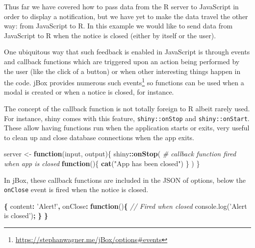 \documentclass[10pt,]{krantz}
\makeatletter
\newenvironment{Shaded}{\begin{snugshade}}{\end{snugshade}}
\newcommand{\AttributeTok}[1]{\textcolor[rgb]{0.61,0.61,0.61}{#1}}
\newcommand{\CommentTok}[1]{\textcolor[rgb]{0.37,0.37,0.37}{\textit{#1}}}
\newcommand{\ControlFlowTok}[1]{\textcolor[rgb]{0.27,0.27,0.27}{\textbf{#1}}}
\newcommand{\DataTypeTok}[1]{\textcolor[rgb]{0.27,0.27,0.27}{#1}}
\newcommand{\KeywordTok}[1]{\textcolor[rgb]{0.27,0.27,0.27}{\textbf{#1}}}
\newcommand{\NormalTok}[1]{#1}
\newcommand{\OperatorTok}[1]{\textcolor[rgb]{0.43,0.43,0.43}{\textbf{#1}}}
\newcommand{\StringTok}[1]{\textcolor[rgb]{0.5,0.5,0.5}{#1}}
\newcommand{\VariableTok}[1]{\textcolor[rgb]{0,0,0}{#1}}
\renewcommand{\href}[2]{#2\footnote{\url{#1}}}
\newenvironment{kframe}{%
\medskip{}
\setlength{\fboxsep}{.8em}
 \def\at@end@of@kframe{}%
 \ifinner\ifhmode%
  \def\at@end@of@kframe{\end{minipage}}%
  \begin{minipage}{\columnwidth}%
 \fi\fi%
 \def\FrameCommand##1{\hskip\@totalleftmargin \hskip-\fboxsep
 \colorbox{shadecolor}{##1}\hskip-\fboxsep
     \hskip-\linewidth \hskip-\@totalleftmargin \hskip\columnwidth}%
 \MakeFramed {\advance\hsize-\width
   \@totalleftmargin\z@ \linewidth\hsize
   \@setminipage}}%
 {\par\unskip\endMakeFramed%
 \at@end@of@kframe}
\renewenvironment{Shaded}{\begin{kframe}}{\end{kframe}}
\makeatother
\begin{document}
Thus far we have covered how to pass data from the R server to JavaScript in order to display a notification, but we have yet to make the data travel the other way: from JavaScript to R. In this example we would like to send data from JavaScript to R when the notice is closed (either by itself or the user).

One ubiquitous way that such feedback is enabled in JavaScript is through events and callback functions which are triggered upon an action being performed by the user (like the click of a button) or when other interesting things happen in the code. jBox provides numerous such \href{https://stephanwagner.me/jBox/options\#events}{events} so functions can be used when a modal is created or when a notice is closed, for instance.

The concept of the callback function is not totally foreign to R albeit rarely used. For instance, shiny comes with this feature, \texttt{shiny::onStop} and \texttt{shiny::onStart}. These allow having functions run when the application starts or exits, very useful to clean up and close database connections when the app exits.

\begin{Shaded}
\begin{Highlighting}[]
\NormalTok{server <-}\StringTok{ }\ControlFlowTok{function}\NormalTok{(input, output)\{}
\NormalTok{  shiny}\OperatorTok{::}\KeywordTok{onStop}\NormalTok{(}
    \CommentTok{# callback function fired when app is closed}
    \ControlFlowTok{function}\NormalTok{()\{}
      \KeywordTok{cat}\NormalTok{(}\StringTok{"App has been closed"}\NormalTok{)}
\NormalTok{    \}}
\NormalTok{  )}
\NormalTok{\}}
\end{Highlighting}
\end{Shaded}

In jBox, these callback functions are included in the JSON of options, below the \texttt{onClose} event is fired when the notice is closed.

\begin{Shaded}
\begin{Highlighting}[]
\OperatorTok{\{}
  \DataTypeTok{content}\OperatorTok{:} \StringTok{'Alert!'}\OperatorTok{,}
  \DataTypeTok{onClose}\OperatorTok{:} \KeywordTok{function}\NormalTok{()}\OperatorTok{\{}
    \CommentTok{// Fired when closed }
    \VariableTok{console}\NormalTok{.}\AttributeTok{log}\NormalTok{(}\StringTok{'Alert is closed'}\NormalTok{)}\OperatorTok{;}
  \OperatorTok{\}}
\OperatorTok{\}}
\end{Highlighting}
\end{Shaded}
\end{document}
